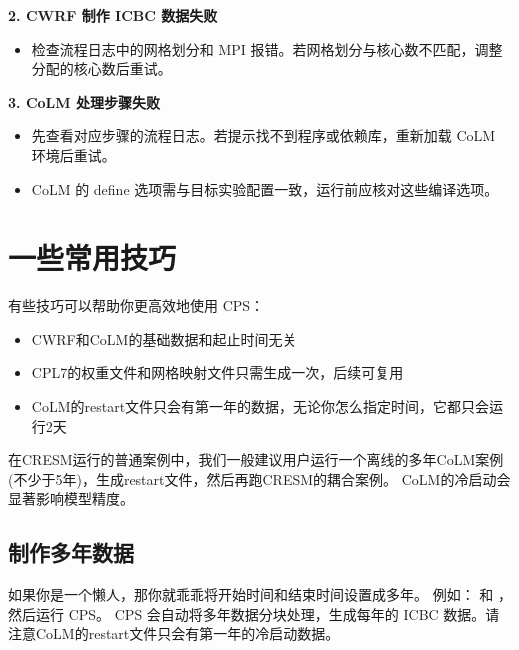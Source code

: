 \documentclass[UTF8,a4paper,11pt,fontset=none]{ctexart}
\begin{document}
\textbf{2. CWRF 制作 ICBC 数据失败}

\begin{itemize}[leftmargin=4em]
    \item 检查流程日志中的网格划分和 MPI 报错。若网格划分与核心数不匹配，调整分配的核心数后重试。
\end{itemize}

\textbf{3. CoLM 处理步骤失败}

\begin{itemize}[leftmargin=4em]
    \item 先查看对应步骤的流程日志。若提示找不到程序或依赖库，重新加载 CoLM 环境后重试。
    \item CoLM 的 define 选项需与目标实验配置一致，运行前应核对这些编译选项。
\end{itemize}

\newpage

\section{一些常用技巧}

有些技巧可以帮助你更高效地使用 CPS：
\begin{itemize}[leftmargin=4em]
    \item CWRF和CoLM的基础数据和起止时间无关
    \item CPL7的权重文件和网格映射文件只需生成一次，后续可复用
    \item CoLM的restart文件只会有第一年的数据，无论你怎么指定时间，它都只会运行2天
\end{itemize}


\begin{CPSNote} [注意]
    在CRESM运行的普通案例中，我们一般建议用户运行一个离线的多年CoLM案例(不少于5年)，生成restart文件，然后再跑CRESM的耦合案例。
    CoLM的冷启动会显著影响模型精度。
\end{CPSNote}

\subsection{制作多年数据}
如果你是一个懒人，那你就乖乖将开始时间和结束时间设置成多年。
例如： 和 ，然后运行 CPS。
CPS 会自动将多年数据分块处理，生成每年的 ICBC 数据。请注意CoLM的restart文件只会有第一年的冷启动数据。

\bigbreak
\end{document}
